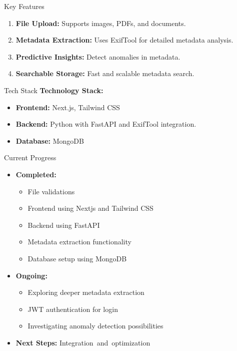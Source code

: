 \documentclass{beamer}
\begin{document}
\begin{frame}{Key Features}
    \begin{enumerate}
        \item \textbf{File Upload:} Supports images, PDFs, and documents.
        \item \textbf{Metadata Extraction:} Uses ExifTool for detailed metadata analysis.
        
        \item \textbf{Predictive Insights:} Detect anomalies in metadata.
        \item \textbf{Searchable Storage:} Fast and scalable metadata search.
    \end{enumerate}
\end{frame}



\begin{frame}{Tech Stack}
    \textbf{Technology Stack:}
    \begin{itemize}
        \item \textbf{Frontend:} Next.js, Tailwind CSS
        \item \textbf{Backend:} Python with FastAPI and ExifTool integration.
        \item \textbf{Database:} MongoDB
    \end{itemize}
\end{frame}

\begin{frame}{Current Progress}
    \begin{itemize}
       \item \textbf{Completed:}
        \begin{itemize}
            
            \item File validations
            \item Frontend using Nextjs and Tailwind CSS
            \item Backend using FastAPI
            \item Metadata extraction functionality
            \item Database setup using MongoDB
        \end{itemize}
         \item \textbf{Ongoing:}
        \begin{itemize}
            \item Exploring deeper metadata extraction
            \item JWT authentication for login
            \item Investigating anomaly detection possibilities     
        \end{itemize}
        \item \textbf{Next Steps:}
        Integration and optimization        
           
        
    \end{itemize}
\end{frame}
\end{document}
